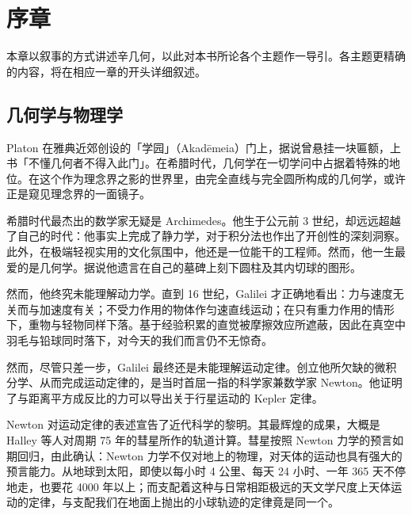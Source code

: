 \chapter{序章}

本章以叙事的方式讲述辛几何，以此对本书所论各个主题作一导引。各主题更精确的内容，将在相应一章的开头详细叙述。

\section{几何学与物理学}

Platon 在雅典近郊创设的「学园」（Akadēmeia）门上，据说曾悬挂一块匾额，上书「不懂几何者不得入此门」。在希腊时代，几何学在一切学问中占据着特殊的地位。在这个作为理念界之影的世界里，由完全直线与完全圆所构成的几何学，或许正是窥见理念界的一面镜子。


希腊时代最杰出的数学家无疑是 Archimedes。他生于公元前 3 世纪，却远远超越了自己的时代：他事实上完成了静力学，对于积分法也作出了开创性的深刻洞察。此外，在极端轻视实用的文化氛围中，他还是一位能干的工程师。然而，他一生最爱的是几何学。据说他遗言在自己的墓碑上刻下圆柱及其内切球的图形。


然而，他终究未能理解动力学。直到 16 世纪，Galilei 才正确地看出：力与速度无关而与加速度有关；不受力作用的物体作匀速直线运动；在只有重力作用的情形下，重物与轻物同样下落。基于经验积累的直觉被摩擦效应所遮蔽，因此在真空中羽毛与铅球同时落下，对今天的我们而言仍不无惊奇。

然而，尽管只差一步，Galilei 最终还是未能理解运动定律。创立他所欠缺的微积分学、从而完成运动定律的，是当时首屈一指的科学家兼数学家 Newton。他证明了与距离平方成反比的力可以导出关于行星运动的 Kepler 定律。

Newton 对运动定律的表述宣告了近代科学的黎明。其最辉煌的成果，大概是 Halley 等人对周期 75 年的彗星所作的轨道计算。彗星按照 Newton 力学的预言如期回归，由此确认：Newton 力学不仅对地上的物理，对天体的运动也具有强大的预言能力。从地球到太阳，即使以每小时 4 公里、每天 24 小时、一年 365 天不停地走，也要花 4000 年以上；而支配着这种与日常相距极远的天文学尺度上天体运动的定律，与支配我们在地面上抛出的小球轨迹的定律竟是同一个。

